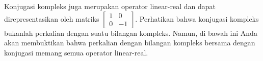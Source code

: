 
Konjugasi kompleks juga merupakan operator linear-real dan dapat
direpresentasikan oleh matriks
$\left[ \begin{smallmatrix} 1 & 0 \\ 0 & -1 \end{smallmatrix} \right]$.
Perhatikan bahwa konjugasi kompleks bukanlah perkalian dengan suatu bilangan
kompleks.
Namun, di bawah ini Anda akan membuktikan bahwa perkalian dengan bilangan
kompleks bersama dengan konjugasi memang  semua operator
linear-real.

